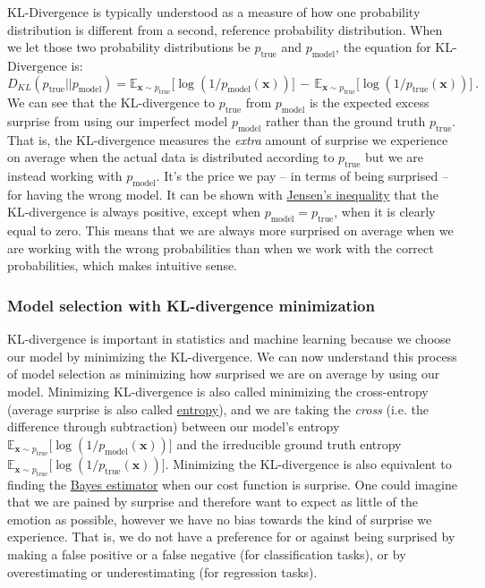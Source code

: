 \documentclass{article}
\begin{document}
KL-Divergence is typically understood as a measure of how one probability distribution is different from a second, reference probability distribution. When we let those two probability distributions be $p_{\mathrm{true}}$ and $p_{\mathrm{model}}$, the equation for KL-Divergence is:
\begin{equation*}
D_{KL}(p_{\mathrm{true}} || p_{\mathrm{model}}) =  \mathbb{E}_{\textbf{x} \sim p_{\mathrm{true}}} \bigr[ \log (1/p_{\mathrm{model}}(\textbf{x})) \bigr] \, - \, \mathbb{E}_{\textbf{x} \sim p_{\mathrm{true}}} \bigr[ \log (1/p_{\mathrm{true}}(\textbf{x})) \bigr] \ .
\end{equation*}
We can see that the KL-divergence to $p_{\mathrm{true}}$ from $p_{\mathrm{model}}$ is the expected excess surprise from using our imperfect model $p_{\mathrm{model}}$ rather than the ground truth $p_{\mathrm{true}}$. That is, the KL-divergence measures the \emph{extra} amount of surprise we experience on average when the actual data is distributed according to $p_{\mathrm{true}}$ but we are instead working with $p_{\mathrm{model}}$. It's the price we pay -- in terms of being surprised -- for having the wrong model. It can be shown with \href{https://en.wikipedia.org/wiki/Jensen\%27s_inequality}{Jensen's inequality} that the KL-divergence is always positive, except when $p_{\mathrm{model}} = p_{\mathrm{true}}$, when it is clearly equal to zero. This means that we are always more surprised on average when we are working with the wrong probabilities than when we work with the correct probabilities, which makes intuitive sense. 

\subsubsection*{Model selection with KL-divergence minimization}
KL-divergence is important in statistics and machine learning because we choose our model by minimizing the KL-divergence. We can now understand this process of model selection as minimizing how surprised we are on average by using our model. Minimizing KL-divergence is also called minimizing the cross-entropy (average surprise is also called \href{https://en.wikipedia.org/wiki/Entropy_(information_theory)}{entropy}), and we are taking the \emph{cross} (i.e. the difference through subtraction) between our model's entropy $\mathbb{E}_{\textbf{x} \sim p_{\mathrm{true}}} \bigr[ \log (1/p_{\mathrm{model}}(\textbf{x})) \bigr]$ and the irreducible ground truth entropy $\mathbb{E}_{\textbf{x} \sim p_{\mathrm{true}}} \bigr[ \log (1/p_{\mathrm{true}}(\textbf{x})) \bigr]$. Minimizing the KL-divergence is also equivalent to finding the \href{https://en.wikipedia.org/wiki/Bayes_estimator}{Bayes estimator} when our cost function is surprise. One could imagine that we are pained by surprise and therefore want to expect as little of the emotion as possible, however we have no bias towards the kind of surprise we experience. That is, we do not have a preference for or against being surprised by making a false positive or a false negative (for classification tasks), or by overestimating or underestimating (for regression tasks). 
\end{document}
